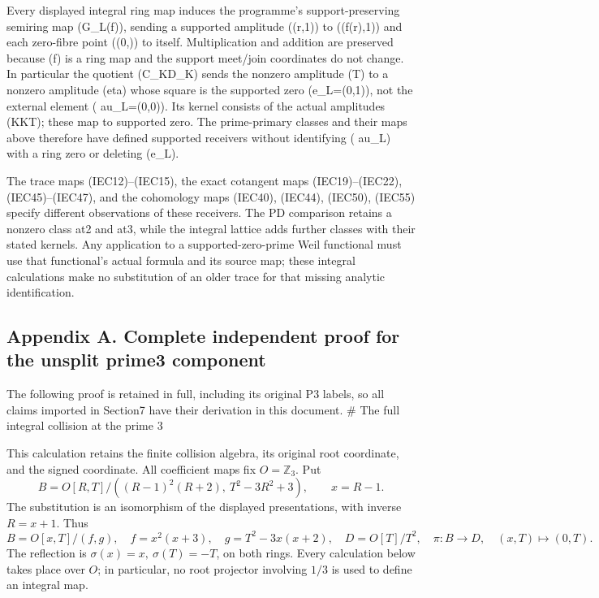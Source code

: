 \documentclass[
]{article}
\begin{document}
Every displayed integral ring map induces the programme's
support-preserving semiring map (G\_L(f)), sending a supported amplitude
((r,1)) to ((f(r),1)) and each zero-fibre point ((0,\lambda)) to itself.
Multiplication and addition are preserved because (f) is a ring map and
the support meet/join coordinates do not change. In particular the
quotient (C\_K\to D\_K) sends the nonzero amplitude (T) to a nonzero
amplitude (eta) whose square is the supported zero (e\_L=(0,1)), not the
external element ( au\_L=(0,0)). Its kernel consists of the actual
amplitudes (K\epsilon\oplus K\epsilon T); these map to supported zero.
The prime-primary classes and their maps above therefore have defined
supported receivers without identifying ( au\_L) with a ring zero or
deleting (e\_L).

The trace maps (IEC12)--(IEC15), the exact cotangent maps
(IEC19)--(IEC22), (IEC45)--(IEC47), and the cohomology maps (IEC40),
(IEC44), (IEC50), (IEC55) specify different observations of these
receivers. The PD comparison retains a nonzero class at2 and at3, while
the integral lattice adds further classes with their stated kernels. Any
application to a supported-zero-prime Weil functional must use that
functional's actual formula and its source map; these integral
calculations make no substitution of an older trace for that missing
analytic identification.

\subsection{Appendix A. Complete independent proof for the unsplit
prime3
component}\label{appendix-a.-complete-independent-proof-for-the-unsplit-prime3-component}

The following proof is retained in full, including its original P3
labels, so all claims imported in Section7 have their derivation in this
document. \# The full integral collision at the prime 3

This calculation retains the finite collision algebra, its original root
coordinate, and the signed coordinate. All coefficient maps fix
\(O=\mathbb Z_3\). Put \[
B=O[R,T]/((R-1)^2(R+2),\ T^2-3R^2+3),\qquad x=R-1.
\tag{P3-1}
\] The substitution is an isomorphism of the displayed presentations,
with inverse \(R=x+1\). Thus \[
B=O[x,T]/(f,g),\quad f=x^2(x+3),\quad
g=T^2-3x(x+2),\quad D=O[T]/T^2,
\quad\pi:B\longrightarrow D,\quad(x,T)\longmapsto(0,T).
\tag{P3-2}
\] The reflection is \(\sigma(x)=x,\ \sigma(T)=-T\), on both rings.
Every calculation below takes place over \(O\); in particular, no root
projector involving \(1/3\) is used to define an integral map.
\end{document}

